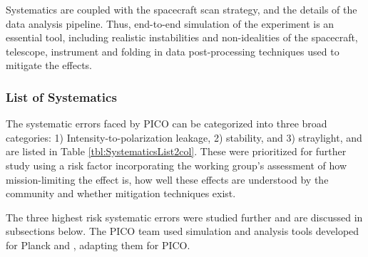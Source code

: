 \documentclass[PICOReport.tex]{subfiles}
\begin{document}
Systematics are coupled with the
spacecraft scan strategy, and the details of the 
data analysis pipeline.
Thus, end-to-end simulation of the experiment is an essential tool,
including realistic instabilities and non-idealities of the spacecraft,
telescope, instrument and folding in data post-processing techniques
used to mitigate the effects.    

\subsubsection{List of Systematics}
The systematic errors faced by PICO can be categorized into three broad categories: 
1) Intensity-to-polarization leakage, 2) stability, and 3) straylight, and are listed in Table \ref{tbl:SystematicsList2col}. 
These were prioritized for further study using a risk factor incorporating the working group's assessment of how mission-limiting the effect is, how well these effects are understood by the community and whether mitigation techniques exist.  

The three highest risk systematic errors were studied further and are discussed in subsections below.  The PICO team used 
 simulation and analysis tools developed for Planck\cite{plank2015_xii_focalplane} and \core, adapting them for PICO.

\end{document}
